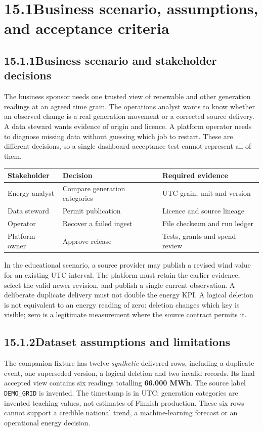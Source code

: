 \documentclass[11pt,twoside]{article}
\newcommand{\topic}[2]{\subsection*{#1\quad #2}}
\begin{document}
\section*{15.1\quad Business scenario, assumptions, and acceptance criteria}
\topic{15.1.1}{Business scenario and stakeholder decisions}
The business sponsor needs one trusted view of renewable and other generation readings at an agreed time grain. The operations analyst wants to know whether an observed change is a real generation movement or a corrected source delivery. A data steward wants evidence of origin and licence. A platform operator needs to diagnose missing data without guessing which job to restart. These are different decisions, so a single dashboard acceptance test cannot represent all of them.
\begin{center}\small\begin{tabularx}{\linewidth}{@{}p{27mm}X X@{}}\toprule
Stakeholder & Decision & Required evidence\\\midrule
Energy analyst & Compare generation categories & UTC grain, unit and version\\
Data steward & Permit publication & Licence and source lineage\\
Operator & Recover a failed ingest & File checksum and run ledger\\
Platform owner & Approve release & Tests, grants and spend review\\\bottomrule
\end{tabularx}\end{center}
In the educational scenario, a source provider may publish a revised wind value for an existing UTC interval. The platform must retain the earlier evidence, select the valid newer revision, and publish a single current observation. A deliberate duplicate delivery must not double the energy KPI. A logical deletion is not equivalent to an energy reading of zero: deletion changes which key is visible; zero is a legitimate measurement where the source contract permits it.
\topic{15.1.2}{Dataset assumptions and limitations}
The companion fixture has twelve \emph{synthetic} delivered rows, including a duplicate event, one superseded version, a logical deletion and two invalid records. Its final accepted view contains six readings totalling \textbf{66.000 MWh}. The source label \texttt{DEMO\_GRID} is invented. The timestamp is in UTC; generation categories are invented teaching values, not estimates of Finnish production. These six rows cannot support a credible national trend, a machine-learning forecast or an operational energy decision.
\end{document}
